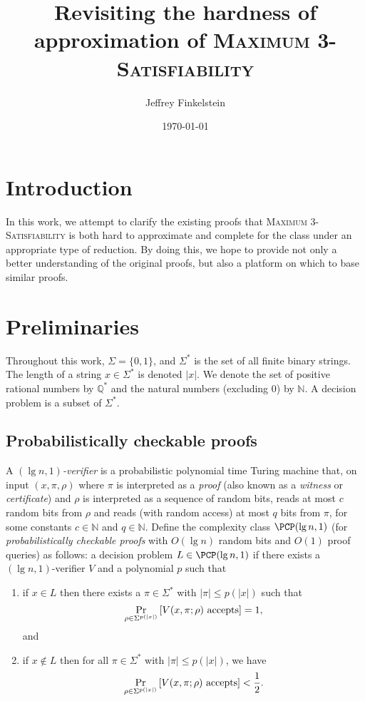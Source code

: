 \documentclass[]{article}
\author{Jef{}frey Finkelstein}
\date{\today}
\title{Revisiting the hardness of approximation of \texorpdfstring{\textsc{Maximum 3-Satisfiability}}{Maximum 3-Satisfiability}}
\theoremstyle{plain}
\theoremstyle{definition}
\begin{document}
\maketitle

\section{Introduction}

In this work, we attempt to clarify the existing proofs that \textsc{Maximum 3-Satisfiability} is both hard to approximate and complete for the class \APX{} under an appropriate type of reduction.
By doing this, we hope to provide not only a better understanding of the original proofs, but also a platform on which to base similar proofs.

\section{Preliminaries}

Throughout this work, $\Sigma=\{0, 1\}$, and $\Sigma^*$ is the set of all finite binary strings.
The length of a string $x \in \Sigma^*$ is denoted $|x|$.
We denote the set of positive rational numbers by $\mathbb{Q}^*$ and the natural numbers (excluding 0) by $\mathbb{N}$.
A decision problem is a subset of $\Sigma^*$.

\subsection{Probabilistically checkable proofs}

A \emph{$(\lg n, 1)$-verifier} is a probabilistic polynomial time Turing machine that, on input $(x, \pi, \rho)$ where $\pi$ is interpreted as a \emph{proof} (also known as a \emph{witness} or \emph{certificate}) and $\rho$ is interpreted as a sequence of random bits, reads at most $c$ random bits from $\rho$ and reads (with random access) at most $q$ bits from $\pi$, for some constants $c \in \mathbb{N}$ and $q \in \mathbb{N}$.
Define the complexity class $\PCP(\lg n, 1)$ (for \emph{probabilistically checkable proofs} with $O(\lg n)$ random bits and $O(1)$ proof queries) as follows: a decision problem $L \in \PCP(\lg n, 1)$ if there exists a $(\lg n, 1)$-verifier $V$ and a polynomial $p$ such that
\begin{enumerate}
\item
  if $x \in L$ then there exists a $\pi \in \Sigma^*$ with $|\pi| \leq p(|x|)$ such that
  \begin{displaymath}
    \Pr_{\rho \in \Sigma^{p(|x|)}}\left[V(x, \pi; \rho) \textnormal{ accepts}\right] = 1,
  \end{displaymath}
  and
\item
  if $x \notin L$ then for all $\pi \in \Sigma^*$ with $|\pi| \leq p(|x|)$, we have
  \begin{displaymath}
    \Pr_{\rho \in \Sigma^{p(|x|)}}\left[V(x, \pi; \rho) \textnormal{ accepts}\right] < \frac{1}{2}.
  \end{displaymath}
\end{enumerate}
\end{document}
